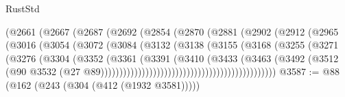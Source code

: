 \begin{lexlean}{RustStd}
\begin{coremodule}
                                  (@2661
                                    (@2667
                                      (@2687
                                        (@2692
                                          (@2854
                                            (@2870
                                              (@2881
                                                (@2902
                                                  (@2912
                                                    (@2965
                                                      (@3016
                                                        (@3054
                                                          (@3072
                                                            (@3084
                                                              (@3132
                                                                (@3138
                                                                  (@3155
                                                                    (@3168
                                                                      (@3255
                                                                        (@3271
                                                                          (@3276
                                                                            (@3304
                                                                              (@3352
                                                                                (@3361
                                                                                  (@3391
                                                                                    (@3410
                                                                                      (@3433
                                                                                        (@3463
                                                                                          (@3492
                                                                                            (@3512
                                                                                              (@90
                                                                                                @3532
                                                                                                (@27
                                                                                                  @89)))))))))))))))))))))))))))))))))))))))))))))))
@3587 := @88 (@162 (@243 (@304 (@412 (@1932 @3581)))))

\end{coremodule}
\end{lexlean}
